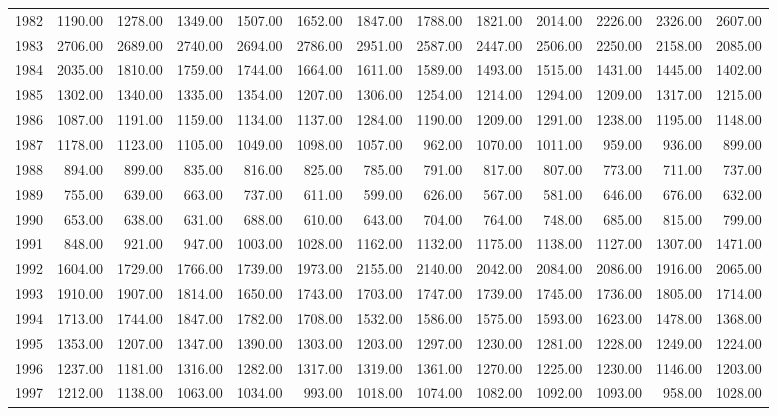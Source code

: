 \begin{longtable}{rrrrrrrrrrrrr}
  1982 & 1190.00 & 1278.00 & 1349.00 & 1507.00 & 1652.00 & 1847.00 & 1788.00 & 1821.00 & 2014.00 & 2226.00 & 2326.00 & 2607.00 \\ 
  1983 & 2706.00 & 2689.00 & 2740.00 & 2694.00 & 2786.00 & 2951.00 & 2587.00 & 2447.00 & 2506.00 & 2250.00 & 2158.00 & 2085.00 \\ 
  1984 & 2035.00 & 1810.00 & 1759.00 & 1744.00 & 1664.00 & 1611.00 & 1589.00 & 1493.00 & 1515.00 & 1431.00 & 1445.00 & 1402.00 \\ 
  1985 & 1302.00 & 1340.00 & 1335.00 & 1354.00 & 1207.00 & 1306.00 & 1254.00 & 1214.00 & 1294.00 & 1209.00 & 1317.00 & 1215.00 \\ 
  1986 & 1087.00 & 1191.00 & 1159.00 & 1134.00 & 1137.00 & 1284.00 & 1190.00 & 1209.00 & 1291.00 & 1238.00 & 1195.00 & 1148.00 \\ 
  1987 & 1178.00 & 1123.00 & 1105.00 & 1049.00 & 1098.00 & 1057.00 & 962.00 & 1070.00 & 1011.00 & 959.00 & 936.00 & 899.00 \\ 
  1988 & 894.00 & 899.00 & 835.00 & 816.00 & 825.00 & 785.00 & 791.00 & 817.00 & 807.00 & 773.00 & 711.00 & 737.00 \\ 
  1989 & 755.00 & 639.00 & 663.00 & 737.00 & 611.00 & 599.00 & 626.00 & 567.00 & 581.00 & 646.00 & 676.00 & 632.00 \\ 
  1990 & 653.00 & 638.00 & 631.00 & 688.00 & 610.00 & 643.00 & 704.00 & 764.00 & 748.00 & 685.00 & 815.00 & 799.00 \\ 
  1991 & 848.00 & 921.00 & 947.00 & 1003.00 & 1028.00 & 1162.00 & 1132.00 & 1175.00 & 1138.00 & 1127.00 & 1307.00 & 1471.00 \\ 
  1992 & 1604.00 & 1729.00 & 1766.00 & 1739.00 & 1973.00 & 2155.00 & 2140.00 & 2042.00 & 2084.00 & 2086.00 & 1916.00 & 2065.00 \\ 
  1993 & 1910.00 & 1907.00 & 1814.00 & 1650.00 & 1743.00 & 1703.00 & 1747.00 & 1739.00 & 1745.00 & 1736.00 & 1805.00 & 1714.00 \\ 
  1994 & 1713.00 & 1744.00 & 1847.00 & 1782.00 & 1708.00 & 1532.00 & 1586.00 & 1575.00 & 1593.00 & 1623.00 & 1478.00 & 1368.00 \\ 
  1995 & 1353.00 & 1207.00 & 1347.00 & 1390.00 & 1303.00 & 1203.00 & 1297.00 & 1230.00 & 1281.00 & 1228.00 & 1249.00 & 1224.00 \\ 
  1996 & 1237.00 & 1181.00 & 1316.00 & 1282.00 & 1317.00 & 1319.00 & 1361.00 & 1270.00 & 1225.00 & 1230.00 & 1146.00 & 1203.00 \\ 
  1997 & 1212.00 & 1138.00 & 1063.00 & 1034.00 & 993.00 & 1018.00 & 1074.00 & 1082.00 & 1092.00 & 1093.00 & 958.00 & 1028.00 \\ 

\end{longtable}
